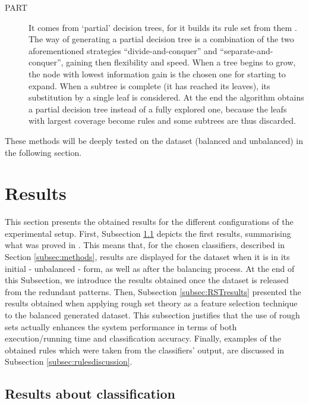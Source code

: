 \documentclass{llncs}
\begin{document}
\begin{description}
 \item[PART] It comes from `partial' decision trees, for it builds its rule set from them \cite{Frank1998}. The way of generating a partial decision tree is a combination of the two aforementioned strategies ``divide-and-conquer'' and ``separate-and-conquer'', gaining then flexibility and speed. When a tree begins to grow, the node with lowest information gain is the chosen one for starting to expand. When a subtree is complete (it has reached its leaves), its substitution by a single leaf is considered. At the end the algorithm obtains a partial decision tree instead of a fully explored one, because the leafs with largest coverage become rules and some subtrees are thus discarded.
 \end{description}

These methods will be deeply tested on the dataset (balanced and unbalanced) in the following section.

%
\section{Results}
\label{sec:results}

This section presents the obtained results for the different configurations of the experimental setup. First, Subsection \ref{subsec:firstresults} depicts the first results, summarising what was proved in \cite{ECTA}. This means that, for the chosen classifiers, described in Section \ref{subsec:methods}, results are displayed for the dataset when it is in its initial - unbalanced - form, as well as after the balancing process. At the end of this Subsection, we introduce the results obtained once the dataset is released from the redundant patterns. Then, Subsection \ref{subsec:RSTresults} presented the results obtained when applying rough set theory as a feature selection technique to the balanced generated dataset. This subsection justifies that the use of rough sets actually enhances the system performance in terms of  both execution/running time and classification accuracy. Finally, examples of the obtained rules which were taken from the classifiers' output, are discussed in Subsection \ref{subsec:rulesdiscussion}.
 
\subsection{Results about classification}
\label{subsec:firstresults}
\end{document}

